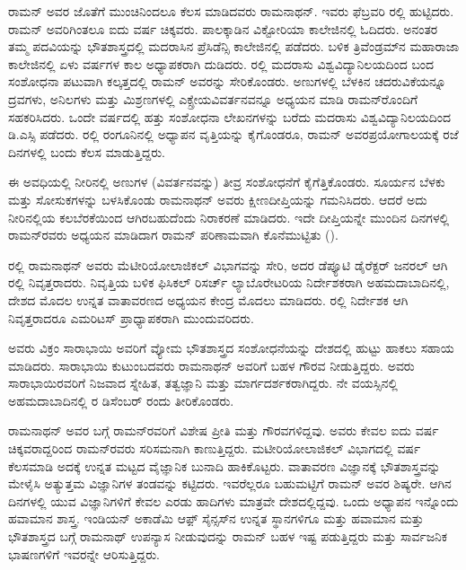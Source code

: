 ರಾಮನ್ ಅವರ ಜೊತೆಗೆ ಮುಂಚಿನಿಂದಲೂ ಕೆಲಸ ಮಾಡಿದವರು ರಾಮನಾಥನ್. ಇವರು ಫೆಬ್ರವರಿ ರಲ್ಲಿ ಹುಟ್ಟಿದರು. ರಾಮನ್ ಅವರಿಗಿಂತಲೂ ಐದು ವರ್ಷ ಚಿಕ್ಕವರು. ಪಾಲಕ್ಕಾಡಿನ ವಿಕ್ಟೋರಿಯಾ ಕಾಲೇಜಿನಲ್ಲಿ ಓದಿದರು. ಅನಂತರ ತಮ್ಮ ಪದವಿಯನ್ನು ಭೌತಶಾಸ್ತ್ರದಲ್ಲಿ ಮದರಾಸಿನ ಪ್ರೆಸಿಡೆನ್ಸಿ ಕಾಲೇಜಿನಲ್ಲಿ ಪಡೆದರು. ಬಳಿಕ ತ್ರಿವೆಂಡ್ರಮ್‍ನ ಮಹಾರಾಜಾ ಕಾಲೇಜಿನಲ್ಲಿ ಏಳು ವರ್ಷಗಳ ಕಾಲ ಅಧ್ಯಾಪಕರಾಗಿ ದುಡಿದರು. ರಲ್ಲಿ ಮದರಾಸು ವಿಶ್ವವಿದ್ಯಾನಿಲಯದಿಂದ ಬಂದ ಸಂಶೋಧನಾ ಪಟುವಾಗಿ ಕಲ್ಕತ್ತದಲ್ಲಿ ರಾಮನ್ ಅವರನ್ನು ಸೇರಿಕೊಂಡರು. ಅಣುಗಳಲ್ಲಿ ಬೆಳಕಿನ ಚದರುವಿಕೆಯನ್ನೂ ದ್ರವಗಳು, ಅನಿಲಗಳು ಮತ್ತು ಮಿಶ್ರಣಗಳಲ್ಲಿ ಎಕ್ಸ್\enginline{-}ರೇಯ\break ವಿವರ್ತನವನ್ನೂ ಅಧ್ಯಯನ ಮಾಡಿ ರಾಮನ್‍ರೊಂದಿಗೆ ಸಹಕರಿಸಿದರು. ಒಂದೇ ವರ್ಷದಲ್ಲಿ ಹತ್ತು ಸಂಶೋಧನಾ ಲೇಖನಗಳನ್ನು ಬರೆದು ಮದರಾಸು ವಿಶ್ವವಿದ್ಯಾನಿಲಯದಿಂದ ಡಿ.ಎಸ್ಸಿ ಪಡೆದರು. ರಲ್ಲಿ ರಂಗೂನಿನಲ್ಲಿ ಅಧ್ಯಾಪನ ವೃತ್ತಿಯನ್ನು ಕೈಗೊಂಡರೂ, ರಾಮನ್ ಅವರ\break ಪ್ರಯೋಗಾಲಯಕ್ಕೆ ರಜೆ ದಿನಗಳಲ್ಲಿ ಬಂದು ಕೆಲಸ ಮಾಡುತ್ತಿದ್ದರು.

ಈ ಅವಧಿಯಲ್ಲಿ ನೀರಿನಲ್ಲಿ ಅಣುಗಳ (ವಿವರ್ತನವನ್ನು) ತೀವ್ರ ಸಂಶೋಧನೆಗೆ ಕೈಗೆತ್ತಿಕೊಂಡರು. ಸೂರ್ಯನ ಬೆಳಕು ಮತ್ತು ಸೋಸುಕಗಳನ್ನು ಬಳಸಿಕೊಂಡು ರಾಮನಾಥನ್ ಅವರು ಕ್ಷೀಣ\break ದೀಪ್ತಿಯನ್ನು ಗಮನಿಸಿದರು. ಆದರೆ ಅದು ನೀರಿನಲ್ಲಿಯ ಕಲಬೆರಕೆಯಿಂದ ಆಗಿರಬಹುದೆಂದು ನಿರಾಕರಣೆ ಮಾಡಿದರು. ಇದೇ ದೀಪ್ತಿಯನ್ನೇ ಮುಂದಿನ ದಿನಗಳಲ್ಲಿ ರಾಮನ್‍ರವರು ಅಧ್ಯಯನ ಮಾಡಿದಾಗ ರಾಮನ್ ಪರಿಣಾಮವಾಗಿ ಕೊನೆಮುಟ್ಟಿತು ().

ರಲ್ಲಿ ರಾಮನಾಥನ್ ಅವರು ಮೆಟೀರಿಯೋಲಾಜಿಕಲ್ ವಿಭಾಗವನ್ನು ಸೇರಿ, ಅದರ ಡೆಪ್ಯೂಟಿ ಡೈರೆಕ್ಟರ್ ಜನರಲ್ ಆಗಿ ರಲ್ಲಿ ನಿವೃತ್ತರಾದರು. ನಿವೃತ್ತಿಯ ಬಳಿಕ ಫಿಸಿಕಲ್ ರಿಸರ್ಚ್ ಲ್ಯಾಬೊರೇಟರಿಯ ನಿರ್ದೇಶಕರಾಗಿ ಅಹಮದಾಬಾದಿನಲ್ಲಿ, ದೇಶದ ಮೊದಲ ಉನ್ನತ ವಾತಾವರಣದ ಅಧ್ಯಯನ ಕೇಂದ್ರ ಮೊದಲು ಮಾಡಿದರು. ರಲ್ಲಿ ನಿರ್ದೇಶಕ ಆಗಿ ನಿವೃತ್ತರಾದರೂ ಎಮರಿಟಸ್ ಪ್ರಾಧ್ಯಾಪಕರಾಗಿ ಮುಂದುವರಿದರು.

ಅವರು ವಿಕ್ರಂ ಸಾರಾಭಾಯಿ ಅವರಿಗೆ ವ್ಯೋಮ ಭೌತಶಾಸ್ತ್ರದ ಸಂಶೋಧನೆಯನ್ನು ದೇಶದಲ್ಲಿ ಹುಟ್ಟು ಹಾಕಲು ಸಹಾಯ ಮಾಡಿದರು. ಸಾರಾಭಾಯಿ ಕುಟುಂಬದವರು ರಾಮನಾಥನ್ ಅವರಿಗೆ ಬಹಳ ಗೌರವ ನೀಡುತ್ತಿದ್ದರು. ಅವರು ಸಾರಾಭಾಯಿರವರಿಗೆ ನಿಜವಾದ ಸ್ನೇಹಿತ, ತತ್ವಜ್ಞಾನಿ ಮತ್ತು ಮಾರ್ಗದರ್ಶಕರಾಗಿದ್ದರು. ನೇ ವಯಸ್ಸಿನಲ್ಲಿ ಅಹಮದಾಬಾದಿನಲ್ಲಿ ರ ಡಿಸೆಂಬರ್ ರಂದು ತೀರಿಕೊಂಡರು.

ರಾಮನಾಥನ್ ಅವರ ಬಗ್ಗೆ ರಾಮನ್‍ರವರಿಗೆ ವಿಶೇಷ ಪ್ರೀತಿ ಮತ್ತು ಗೌರವಗಳಿದ್ದವು. ಅವರು ಕೇವಲ ಐದು ವರ್ಷ ಚಿಕ್ಕವರಾದ್ದರಿಂದ ರಾಮನ್‍ರವರು ಸರಿಸಮನಾಗಿ ಕಾಣುತ್ತಿದ್ದರು. ಮಟೀರಿಯೋ\-ಲಾಜಿಕಲ್ ವಿಭಾಗದಲ್ಲಿ  ವರ್ಷ ಕೆಲಸಮಾಡಿ ಅದಕ್ಕೆ ಉನ್ನತ ಮಟ್ಟದ ವೈಜ್ಞಾನಿಕ ಬುನಾದಿ ಹಾಕಿಕೊಟ್ಟರು. ವಾತಾವರಣ ವಿಜ್ಞಾನಕ್ಕೆ ಭೌತಶಾಸ್ತ್ರವನ್ನು ಮೇಳೈಸಿ ಅತ್ಯುತ್ತಮ ವಿಜ್ಞಾನಿಗಳ ತಂಡವನ್ನು ಕಟ್ಟಿದರು. ಇವರೆಲ್ಲರೂ ಬಹುಮಟ್ಟಿಗೆ ರಾಮನ್ ಅವರ ಶಿಷ್ಯರೇ. ಆಗಿನ ದಿನಗಳಲ್ಲಿ ಯುವ ವಿಜ್ಞಾನಿಗಳಿಗೆ ಕೇವಲ ಎರಡು ಹಾದಿಗಳು ಮಾತ್ರವೇ ದೇಶದಲ್ಲಿದ್ದವು. ಒಂದು ಅಧ್ಯಾಪನ ಇನ್ನೊಂದು ಹವಾಮಾನ ಶಾಸ್ತ್ರ. ಇಂಡಿಯನ್ ಅಕಾಡೆಮಿ ಆಫ಼್ ಸೈನ್ಸಸ್‍ನ ಉನ್ನತ ಸ್ಥಾನಗಳಿಗೂ ಮತ್ತು ಹವಾಮಾನ ಮತ್ತು ಭೌತಶಾಸ್ತ್ರದ ಬಗ್ಗೆ ರಾಮನಾಥ್ ಉಪನ್ಯಾಸ ನೀಡುವುದನ್ನು ರಾಮನ್ ಬಹಳ ಇಷ್ಟ ಪಡುತ್ತಿದ್ದರು ಮತ್ತು ಸಾರ್ವಜನಿಕ ಭಾಷಣಗಳಿಗೆ ಇವರನ್ನೇ ಆರಿಸುತ್ತಿದ್ದರು.

